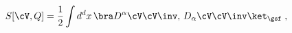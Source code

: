 \begin{equation}
S[\cV, Q] = \frac{1}{2} \int d^d x\, \bra D^{\alpha} \cV
\cV\inv , \,D_{\alpha} \cV\cV\inv \ket_{\gsf}\;,
\label{sact1}
\end{equation} 
